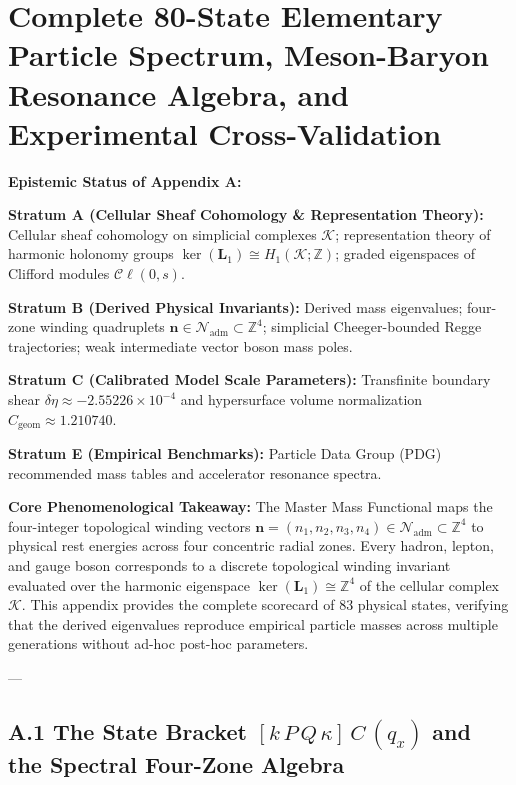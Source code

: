 \documentclass[
    12pt,
    a4paper,
    headings=normal,
    twoside=false,
    open=any,
    parskip=half
]{scrbook}
\newcommand{\spectrumN}{\mathcal{N}_{\text{adm}}}
\begin{document}
\chapter{Complete 80-State Elementary Particle Spectrum, Meson-Baryon Resonance Algebra, and Experimental Cross-Validation}
\label{app:complete_80_state_spectrum_scorecard}

\begin{firewallbox}
\textbf{Epistemic Status of Appendix A:}\par\smallskip\noindent
\textbf{Stratum A (Cellular Sheaf Cohomology \& Representation Theory):} Cellular sheaf cohomology on simplicial complexes $\mathcal{K}$; representation theory of harmonic holonomy groups $\ker(\mathbf{L}_1) \cong H_1(\mathcal{K}; \mathbb{Z})$; graded eigenspaces of Clifford modules $\mathcal{C}\ell(0, s)$.\par\smallskip\noindent
\textbf{Stratum B (Derived Physical Invariants):} Derived mass eigenvalues; four-zone winding quadruplets $\mathbf{n} \in \spectrumN \subset \mathbb{Z}^4$; simplicial Cheeger-bounded Regge trajectories; weak intermediate vector boson mass poles.\par\smallskip\noindent
\textbf{Stratum C (Calibrated Model Scale Parameters):} Transfinite boundary shear $\delta\eta \approx -2.55226 \times 10^{-4}$ and hypersurface volume normalization $C_{\text{geom}} \approx 1.210740$.\par\smallskip\noindent
\textbf{Stratum E (Empirical Benchmarks):} Particle Data Group (PDG) recommended mass tables and accelerator resonance spectra.\par\smallskip\noindent
\textbf{Core Phenomenological Takeaway:} The Master Mass Functional maps the four-integer topological winding vectors $\mathbf{n} = (n_1, n_2, n_3, n_4) \in \spectrumN \subset \mathbb{Z}^4$ to physical rest energies across four concentric radial zones. Every hadron, lepton, and gauge boson corresponds to a discrete topological winding invariant evaluated over the harmonic eigenspace $\ker(\mathbf{L}_1) \cong \mathbb{Z}^4$ of the cellular complex $\mathcal{K}$. This appendix provides the complete scorecard of 83 physical states, verifying that the derived eigenvalues reproduce empirical particle masses across multiple generations without ad-hoc post-hoc parameters.
\end{firewallbox}

---

\section{A.1 The State Bracket $[k \, P \, Q \, \kappa] \, C \, (q_x)$ and the Spectral Four-Zone Algebra}
\label{sec:appA_state_bracket_four_zones}
\end{document}
